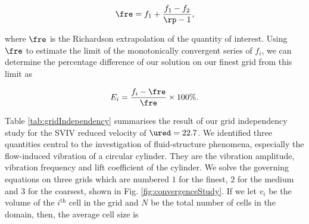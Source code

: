 \documentclass[a4paper,fleqn]{cas-sc}
\begin{document}
\begin{equation}
  \fre = f_{1} + \frac{f_{1} - f_{2}}{\rp - 1},
  \label{eq:richardsonExtrapolation}
\end{equation}

\noindent where $\fre$ is the Richardson extrapolation of the quantity of interest. Using $\fre$ to estimate the limit of the monotonically convergent series of $f_{i}$, we can determine the percentage difference of our solution on our finest grid from this limit as

\begin{equation}
  E_{i} = \frac{f_{i} - \fre}{\fre} \times 100\%.
  \label{eq:percentageDifference}
\end{equation}

Table \ref{tab:gridIndependency} summarises the result of our grid independency study for the SVIV reduced velocity of $\ured = 22.7$. We identified three quantities central to the investigation of fluid-structure phenomena, especially the flow-induced vibration of a circular cylinder. They are the vibration amplitude, vibration frequency and lift coefficient of the cylinder. We solve the governing equations on three grids which are numbered $1$ for the finest, $2$ for the medium and $3$ for the coarsest, shown in Fig. \ref{fig:convergenceStudy}. If we let $v_{i}$ be the volume of the $i^{\text{th}}$ cell in the grid and $N$ be the total number of cells in the domain, then, the average cell size is
\end{document}

